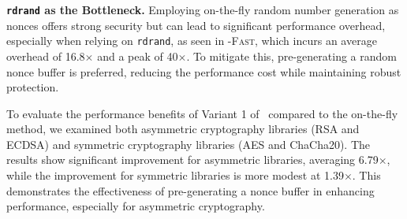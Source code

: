 \noindent \textbf{\texttt{rdrand} as the Bottleneck.}
Employing on-the-fly random number generation as nonces offers strong security but can lead to significant performance overhead, especially when relying on \texttt{rdrand}, as seen in \ftool-\textsc{Fast}, which incurs an average overhead of 16.8$\times$ and a peak of 40$\times$. 
To mitigate this, pre-generating a random nonce buffer is preferred, reducing the performance cost while maintaining robust protection.

To evaluate the performance benefits of Variant 1 of \tool\ compared to the on-the-fly method, we examined both asymmetric cryptography libraries (RSA and ECDSA) and symmetric cryptography libraries (AES and ChaCha20). 
The results show significant improvement for asymmetric libraries, averaging 6.79$\times$, while the improvement for symmetric libraries is more modest at 1.39$\times$. 
This demonstrates the effectiveness of pre-generating a nonce buffer in enhancing performance, especially for asymmetric cryptography.


